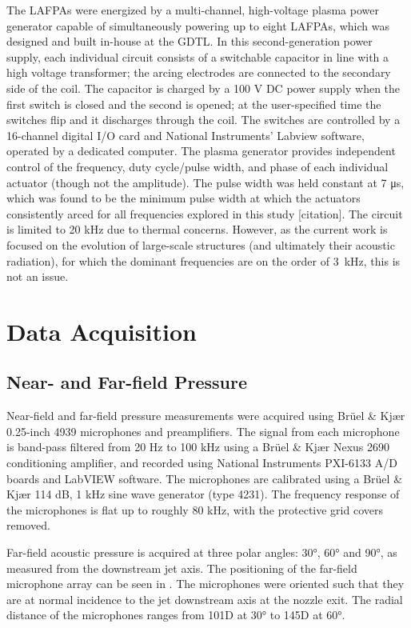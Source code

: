 The LAFPAs were energized by a multi-channel, high-voltage plasma power generator capable of simultaneously powering up to eight LAFPAs, which was designed and built in-house at the GDTL. 
In this second-generation power supply, each individual circuit consists of a switchable capacitor in line with a high voltage transformer; the arcing electrodes are connected to the secondary side of the coil. 
The capacitor is charged by a 100 V DC power supply when the first switch is closed and the second is opened; at the user-specified time the switches flip and it discharges through the coil. 
The switches are controlled by a 16-channel digital I/O card and National Instruments' Labview software, operated by a dedicated computer. The plasma generator provides independent control of the frequency, duty cycle/pulse width, and phase of each individual actuator (though not the amplitude). 
The pulse width was held constant at 7 μs, which was found to be the minimum pulse width at which the actuators consistently arced for all frequencies explored in this study [citation]. 
The circuit is limited to 20 kHz due to thermal concerns.
However, as the current work is focused on the evolution of large-scale structures (and ultimately their acoustic radiation), for which the dominant frequencies are on the order of 3~kHz, this is not an issue.

\section{Data Acquisition}
\subsection{Near- and Far-field Pressure}
\label{sect:NF_methodology}
Near-field and far-field pressure measurements were acquired using Br\"{u}el \& Kj\ae{}r 0.25-inch 4939 microphones and preamplifiers. 
The signal from each microphone is band-pass filtered from 20 Hz to 100 kHz using a Br\"{u}el \& Kj\ae{}r Nexus 2690 conditioning amplifier, and recorded using National Instruments PXI-6133 A/D boards and LabVIEW software. 
The microphones are calibrated using a Br\"{u}el \& Kj\ae{}r 114 dB, 1 kHz sine wave generator (type 4231). 
The frequency response of the microphones is flat up to roughly 80 kHz, with the protective grid covers removed. 

Far-field acoustic pressure is acquired at three polar angles: 30°, 60° and 90°, as measured from the downstream jet axis. 
The positioning of the far-field microphone array can be seen in .
The microphones were oriented such that they are at normal incidence to the jet downstream axis at the nozzle exit. 
The radial distance of the microphones ranges from 101D at 30° to 145D at 60°. 

